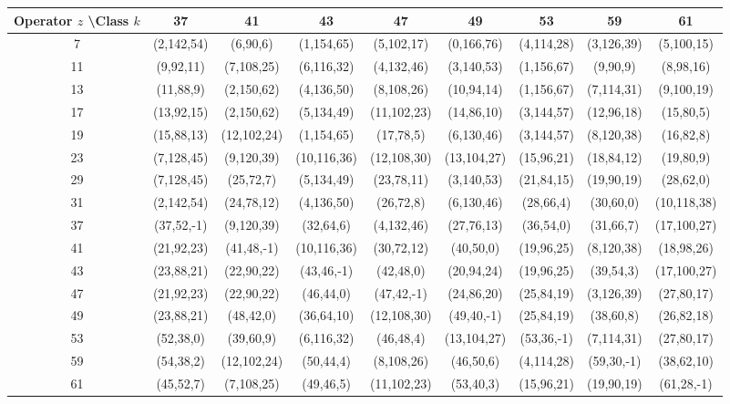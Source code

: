 \documentclass[11pt,a4paper]{article}
\begin{document}
\begin{table}[htbp]
\centering
\tiny
\begin{tabular}{c|cccccccc}
Operator \(z\) \textbackslash Class \(k\) & 37 & 41 & 43 & 47 & 49 & 53 & 59 & 61 \\
\hline
7  & (2,142,54) & (6,90,6) & (1,154,65) & (5,102,17) & (0,166,76) & (4,114,28) & (3,126,39) & (5,100,15) \\
11 & (9,92,11) & (7,108,25) & (6,116,32) & (4,132,46) & (3,140,53) & (1,156,67) & (9,90,9) & (8,98,16) \\
13 & (11,88,9) & (2,150,62) & (4,136,50) & (8,108,26) & (10,94,14) & (1,156,67) & (7,114,31) & (9,100,19) \\
17 & (13,92,15) & (2,150,62) & (5,134,49) & (11,102,23) & (14,86,10) & (3,144,57) & (12,96,18) & (15,80,5) \\
19 & (15,88,13) & (12,102,24) & (1,154,65) & (17,78,5) & (6,130,46) & (3,144,57) & (8,120,38) & (16,82,8) \\
23 & (7,128,45) & (9,120,39) & (10,116,36) & (12,108,30) & (13,104,27) & (15,96,21) & (18,84,12) & (19,80,9) \\
29 & (7,128,45) & (25,72,7) & (5,134,49) & (23,78,11) & (3,140,53) & (21,84,15) & (19,90,19) & (28,62,0) \\
31 & (2,142,54) & (24,78,12) & (4,136,50) & (26,72,8) & (6,130,46) & (28,66,4) & (30,60,0) & (10,118,38) \\
37 & (37,52,-1) & (9,120,39) & (32,64,6) & (4,132,46) & (27,76,13) & (36,54,0) & (31,66,7) & (17,100,27) \\
41 & (21,92,23) & (41,48,-1) & (10,116,36) & (30,72,12) & (40,50,0) & (19,96,25) & (8,120,38) & (18,98,26) \\
43 & (23,88,21) & (22,90,22) & (43,46,-1) & (42,48,0) & (20,94,24) & (19,96,25) & (39,54,3) & (17,100,27) \\
47 & (21,92,23) & (22,90,22) & (46,44,0) & (47,42,-1) & (24,86,20) & (25,84,19) & (3,126,39) & (27,80,17) \\
49 & (23,88,21) & (48,42,0) & (36,64,10) & (12,108,30) & (49,40,-1) & (25,84,19) & (38,60,8) & (26,82,18) \\
53 & (52,38,0) & (39,60,9) & (6,116,32) & (46,48,4) & (13,104,27) & (53,36,-1) & (7,114,31) & (27,80,17) \\
59 & (54,38,2) & (12,102,24) & (50,44,4) & (8,108,26) & (46,50,6) & (4,114,28) & (59,30,-1) & (38,62,10) \\
61 & (45,52,7) & (7,108,25) & (49,46,5) & (11,102,23) & (53,40,3) & (15,96,21) & (19,90,19) & (61,28,-1) \\

\end{tabular}
\end{table}
\end{document}
